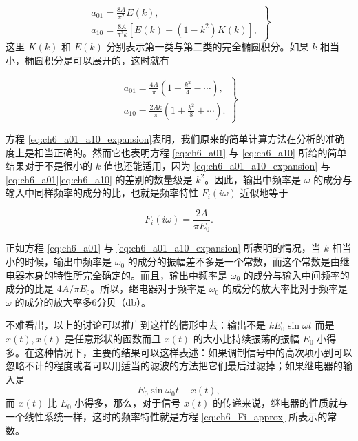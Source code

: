 \begin{equation}\label{eq:ch6_a01_a10_elliptic}
\left.
\begin{array}{l}
a_{01} = \frac{8A}{\pi^2} E(k),\\
a_{10} = \frac{8A}{\pi^2 k} [E(k) - (1 - k^2)K(k)],
\end{array}
\right\}
\end{equation}
这里 $K(k)$ 和 $E(k)$ 分别表示第一类与第二类的完全椭圆积分。如果 $k$ 相当小，椭圆积分是可以展开的，这时就有

\begin{equation}\label{eq:ch6_a01_a10_expansion}
\left.
\begin{array}{l}
a_{01} = \frac{4A}{\pi} \left( 1 - \frac{k^2}{4} - \cdots \right),\\
a_{10} = \frac{2Ak}{\pi} \left( 1 + \frac{k^2}{8} + \cdots \right).
\end{array}
\right\}
\end{equation}

方程 \eqref{eq:ch6_a01_a10_expansion}表明，我们原来的简单计算方法在分析的准确度上是相当正确的。然而它也表明方程 \eqref{eq:ch6_a01} 与 \eqref{eq:ch6_a10} 所给的简单结果对于不是很小的 $k$ 值也还能适用，因为 \eqref{eq:ch6_a01_a10_expansion} 与 \eqref{eq:ch6_a01}\eqref{eq:ch6_a10} 的差别的数量级是 $k^2$。因此，输出中频率是 $\omega$ 的成分与输入中同样频率的成分的比，也就是频率特性 $F_i(i\omega)$ 近似地等于

\begin{equation}\label{eq:ch6_Fi_approx}
F_i(i\omega) = \frac{2A}{\pi E_0}.
\end{equation}

正如方程 \eqref{eq:ch6_a01} 与 \eqref{eq:ch6_a01_a10_expansion} 所表明的情况，当 $k$ 相当小的时候，输出中频率是 $\omega_0$ 的成分的振幅差不多是一个常数，而这个常数是由继电器本身的特性所完全确定的。而且，输出中频率是 $\omega_0$ 的成分与输入中间频率的成分的比是 $4A/\pi E_0$。所以，继电器对于频率是 $\omega_0$ 的成分的放大率比对于频率是 $\omega$ 的成分的放大率多6分贝（db）。

不难看出，以上的讨论可以推广到这样的情形中去：输出不是 $kE_0 \sin \omega t$ 而是 $x(t), x(t)$ 是任意形状的函数而且 $x(t)$ 的大小比持续振荡的振幅 $E_0$ 小得多。在这种情况下，主要的结果可以这样表述：如果调制信号中的高次项小到可以忽略不计的程度或者可以用适当的滤波的方法把它们最后过滤掉；如果继电器的输入是
\begin{equation*}
E_0 \sin \omega_0 t + x(t),
\end{equation*}
而 $x(t)$ 比 $E_0$ 小得多，那么，对于信号 $x(t)$ 的传递来说，继电器的性质就与一个线性系统一样，这时的频率特性就是方程 \eqref{eq:ch6_Fi_approx} 所表示的常数。

